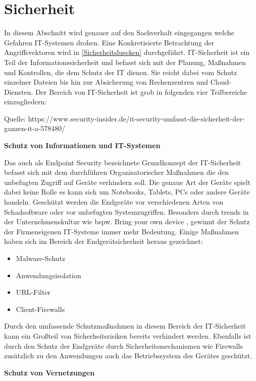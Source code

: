 \section{Sicherheit}\label{Sicherheit}
In diesem Abschnitt wird genauer auf den Sachverhalt eingegangen welche Gefahren \ac*{IT}-Systemen drohen.
Eine Konkretisierte Betrachtung der Angriffsvektoren wird in \autoref{Sicherheitsluecken} durchgeführt.
IT-Sicherheit ist ein Teil der Informationssicherheit und befasst sich mit der Planung, Maßnahmen und Kontrollen, die dem Schutz der IT dienen.
Sie reicht dabei vom Schutz einzelner Dateien bis hin zur Absicherung von Rechenzentren und Cloud-Diensten. 
Der Bereich von IT-Sicherheit ist grob in folgenden vier Teilbereiche einzugliedern: 

Quelle: https://www.security-insider.de/it-security-umfasst-die-sicherheit-der-ganzen-it-a-578480/

\textbf{Schutz von Informationen und IT-Systemen}

Das auch als \glqq Endpoint Security \grqq{} bezeichnete Grundkonzept der IT-Sicherheit befasst sich mit dem durchführen 
Organisatorischer Maßnahmen die den unbefugten Zugriff auf Geräte verhindern soll. 
Die genaue Art der Geräte spielt dabei keine Rolle es kann sich um Notebooks, Tablets, PCs oder andere Geräte handeln. 
Geschützt werden die Endgeräte vor verschiedenen Arten von Schadsoftware oder vor unbefugten Systemzugriffen. 
Besonders durch trends in der Unternehmenskultur wie bspw. \glqq Bring your own device \grqq{}, gewinnt der Schutz der Firmeneigenen 
IT-Systeme immer mehr Bedeutung. 
Einige Maßnahmen haben sich im Bereich der Endgerätsicherheit heraus gezeichnet: 

\begin{itemize}
    \item Malware-Schutz
    \item Anwendungsisolation
    \item URL-Filter
    \item Client-Firewalls
\end{itemize}
\cite{Dipl.Ing.FHStefanLuberPeterSchmitz.2020}

Durch den umfassende Schutzmaßnahmen in diesem Bereich der IT-Sicherheit kann ein Großteil von Sicherheitsrisiken bereits 
verhindert werden. Ebenfalls ist durch den Schutz der Endgeräte durch Sicherheitsmechanismen wie Firewalls zusätzlich zu den 
Anwendungen auch das Betriebssystem des Gerätes geschützt. 

\textbf{Schutz von Vernetzungen}

